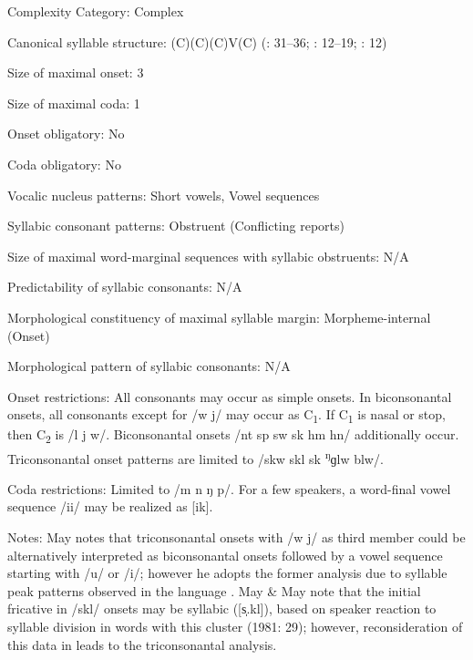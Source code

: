 {\begin{appendixdesc}
\item[Complexity Category:] Complex

\item[Canonical syllable structure:] (C)(C)(C)V(C) (\citealt{Anceaux1965}: 31--36; \citealt{May1997}: 12--19; \citealt{MayMay1981}: 12)

\item[Size of maximal onset:] 3

\item[Size of maximal coda:] 1

\item[Onset obligatory:] No

\item[Coda obligatory:] No

\item[Vocalic nucleus patterns:] Short vowels, Vowel sequences

\item[Syllabic consonant patterns:] Obstruent (Conflicting reports)

\item[Size of maximal word-marginal sequences with syllabic obstruents:] N/A

\item[Predictability of syllabic consonants:] N/A

\item[Morphological constituency of maximal syllable margin:] Morpheme-internal (Onset)

\item[Morphological pattern of syllabic consonants:] N/A

\item[Onset restrictions:] All consonants may occur as simple onsets. In biconsonantal onsets, all consonants except for /w j/ may occur as C\textsubscript{1}. If C\textsubscript{1} is nasal or stop, then C\textsubscript{2} is /l j w/. Biconsonantal onsets /nt sp sw sk hm hn/ additionally occur. Triconsonantal onset patterns are limited to /skw skl sk \textsuperscript{ŋ}ɡlw blw/.

\item[Coda restrictions:] Limited to /m n ŋ p/. For a few speakers, a word-final vowel sequence /ii/ may be realized as [ik].

\item[Notes:] May notes that triconsonantal onsets with /w j/ as third member could be alternatively interpreted as biconsonantal onsets followed by a vowel sequence starting with /u/ or /i/; however he adopts the former analysis due to syllable peak patterns observed in the language \citep[17--18]{May1997}. May \& May note that the initial fricative in /skl/ onsets may be syllabic ([s̩.kl]), based on speaker reaction to syllable division in words with this cluster (1981: 29); however, reconsideration of this data in \citet{May1997} leads to the triconsonantal analysis.
\end{appendixdesc}
}
